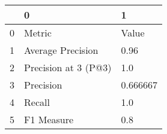 \begin{tabular}{lll}
\toprule
{} &                     0 &         1 \\
\midrule
0 &                Metric &     Value \\
1 &     Average Precision &      0.96 \\
2 &  Precision at 3 (P@3) &       1.0 \\
3 &             Precision &  0.666667 \\
4 &                Recall &       1.0 \\
5 &            F1 Measure &       0.8 \\
\bottomrule
\end{tabular}
